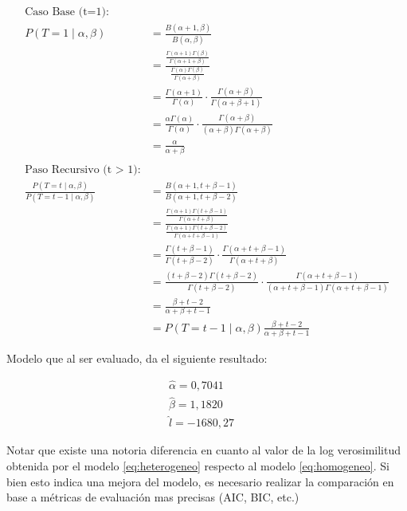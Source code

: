 \documentclass[
]{book}
\begin{document}
\[
\begin{aligned}
\text{Caso Base (t=1):}& \\
P(T=1 \mid \alpha, \beta) &= \frac{B(\alpha+1, \beta)}{B(\alpha, \beta)} \\
&= \frac{\frac{\Gamma(\alpha+1)\Gamma(\beta)}{\Gamma(\alpha+1+\beta)}}{\frac{\Gamma(\alpha)\Gamma(\beta)}{\Gamma(\alpha+\beta)}} \\
&= \frac{\Gamma(\alpha+1)}{\Gamma(\alpha)} \cdot \frac{\Gamma(\alpha+\beta)}{\Gamma(\alpha+\beta+1)} \\
&= \frac{\alpha\Gamma(\alpha)}{\Gamma(\alpha)} \cdot \frac{\Gamma(\alpha+\beta)}{(\alpha+\beta)\Gamma(\alpha+\beta)} \\
&= \frac{\alpha}{\alpha+\beta} \\
\\
\text{Paso Recursivo (t > 1):}& \\
\frac{P(T=t \mid \alpha, \beta)}{P(T=t-1 \mid \alpha, \beta)} &= \frac{B(\alpha+1, t+\beta-1)}{B(\alpha+1, t+\beta-2)} \\
&= \frac{\frac{\Gamma(\alpha+1)\Gamma(t+\beta-1)}{\Gamma(\alpha+t+\beta)}}{\frac{\Gamma(\alpha+1)\Gamma(t+\beta-2)}{\Gamma(\alpha+t+\beta-1)}} \\
&= \frac{\Gamma(t+\beta-1)}{\Gamma(t+\beta-2)} \cdot \frac{\Gamma(\alpha+t+\beta-1)}{\Gamma(\alpha+t+\beta)} \\
&= \frac{(t+\beta-2)\Gamma(t+\beta-2)}{\Gamma(t+\beta-2)} \cdot \frac{\Gamma(\alpha+t+\beta-1)}{(\alpha+t+\beta-1)\Gamma(\alpha+t+\beta-1)} \\
&= \frac{\beta+t-2}{\alpha+\beta+t-1} \\
&= P(T=t-1 \mid \alpha, \beta) \frac{\beta+t-2}{\alpha+\beta+t-1}
\end{aligned}
\]

Modelo que al ser evaluado, da el siguiente resultado:

\[
\begin{array}{c}
\hat{\alpha} = 0,7041\\
\hat{\beta}= 1,1820\\
\hat{l} = -1680,27
\end{array}
\quad \label{eq:heterogeneo}
\]

Notar que existe una notoria diferencia en cuanto al valor de la log
verosimilitud obtenida por el modelo \eqref{eq:heterogeneo} respecto al
modelo \eqref{eq:homogeneo}. Si bien esto indica una mejora del modelo,
es necesario realizar la comparación en base a métricas de evaluación
mas precisas (AIC, BIC, etc.)
\end{document}
